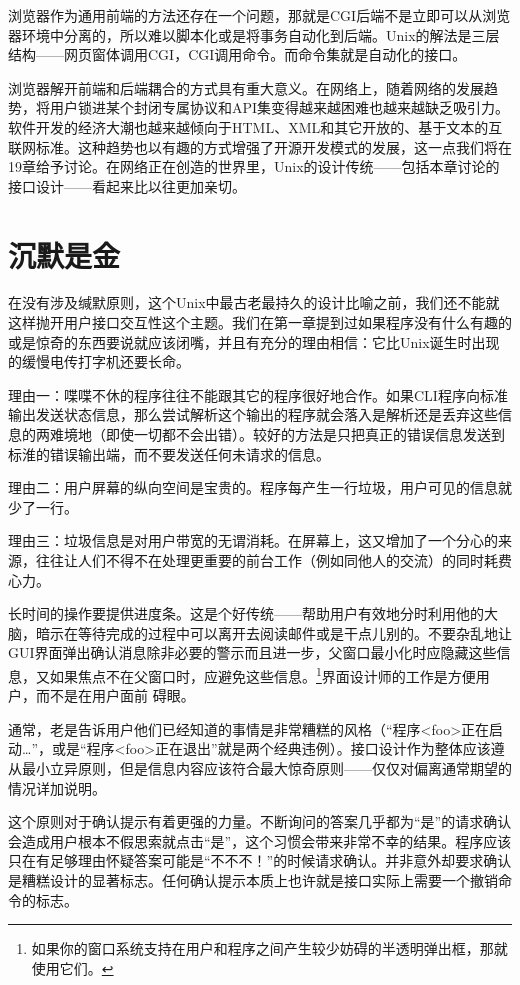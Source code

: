 \documentclass[12pt,oneside]{book}
\begin{document}
浏览器作为通用前端的方法还存在一个问题，那就是CGI后端不是立即可以从浏览器环境中分离的，所以难以脚本化或是将事务自动化到后端。Unix的解法是三层结构——网页窗体调用CGI，CGI调用命令。而命令集就是自动化的接口。

浏览器解开前端和后端耦合的方式具有重大意义。在网络上，随着网络的发展趋势，将用户锁进某个封闭专属协议和API集变得越来越困难也越来越缺乏吸引力。软件开发的经济大潮也越来越倾向于HTML、XML和其它开放的、基于文本的互联网标准。这种趋势也以有趣的方式增强了开源开发模式的发展，这一点我们将在19章给予讨论。在网络正在创造的世界里，Unix的设计传统——包括本章讨论的接口设计——看起来比以往更加亲切。

\section{沉默是金}
在没有涉及缄默原则，这个Unix中最古老最持久的设计比喻之前，我们还不能就这样抛开用户接口交互性这个主题。我们在第一章提到过如果程序没有什么有趣的或是惊奇的东西要说就应该闭嘴，并且有充分的理由相信：它比Unix诞生时出现的缓慢电传打字机还要长命。

理由一：喋喋不休的程序往往不能跟其它的程序很好地合作。如果CLI程序向标准输出发送状态信息，那么尝试解析这个输出的程序就会落入是解析还是丢弃这些信息的两难境地（即使一切都不会出错）。较好的方法是只把真正的错误信息发送到标淮的错误输出端，而不要发送任何未请求的信息。

理由二：用户屏幕的纵向空间是宝贵的。程序每产生一行垃圾，用户可见的信息就少了一行。

理由三：垃圾信息是对用户带宽的无谓消耗。在屏幕上，这又增加了一个分心的来源，往往让人们不得不在处理更重要的前台工作（例如同他人的交流）的同时耗费心力。

长时间的操作要提供进度条。这是个好传统——帮助用户有效地分时利用他的大脑，暗示在等待完成的过程中可以离开去阅读邮件或是干点儿别的。不要杂乱地让GUI界面弹出确认消息除非必要的警示而且进一步，父窗口最小化时应隐藏这些信息，又如果焦点不在父窗口时，应避免这些信息。\footnote{如果你的窗口系统支持在用户和程序之间产生较少妨碍的半透明弹出框，那就使用它们。}界面设计师的工作是方便用户，而不是在用户面前
碍眼。

通常，老是告诉用户他们已经知道的事情是非常糟糕的风格（“程序<foo>正在启动…”，或是“程序<foo>正在退出”就是两个经典违例）。接口设计作为整体应该遵从最小立异原则，但是信息内容应该符合最大惊奇原则——仅仅对偏离通常期望的情况详加说明。

这个原则对于确认提示有着更强的力量。不断询问的答案几乎都为“是”的请求确认会造成用户根本不假思索就点击“是”，这个习惯会带来非常不幸的结果。程序应该只在有足够理由怀疑答案可能是“不不不！”的时候请求确认。并非意外却要求确认是糟糕设计的显著标志。任何确认提示本质上也许就是接口实际上需要一个撤销命令的标志。
\end{document}
